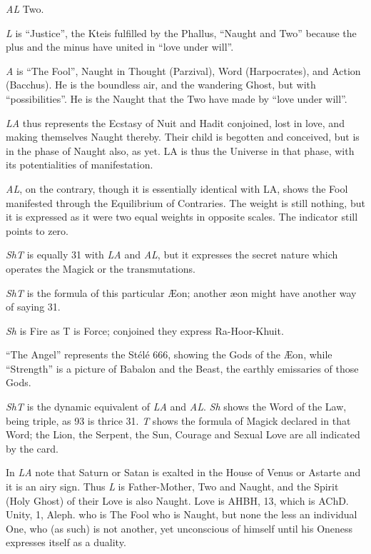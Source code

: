 \textit{AL} \textemdash{} Two.

\textit{L} is \enquote{Justice}, the Kteis fulfilled by the Phallus, \enquote{Naught and Two} because the plus and the minus have united in \enquote{love under will}.

\textit{A} is \enquote{The Fool}, Naught in Thought (Parzival), Word (Harpocrates), and Action (Bacchus). He is the boundless air, and the wandering Ghost, but with \enquote{possibilities}. He is the Naught that the Two have made by \enquote{love under will}.

\textit{LA} thus represents the Ecstasy of Nuit and Hadit conjoined, lost in love, and making themselves Naught thereby. Their child is begotten and conceived, but is in the phase of Naught also, as yet. LA is thus the Universe in that phase, with its potentialities of manifestation.

\textit{AL}, on the contrary, though it is essentially identical with LA, shows the Fool manifested through the Equilibrium of Contraries. The weight is still nothing, but it is expressed as it were two equal weights in opposite scales. The indicator still points to zero.

\textit{ShT} is equally 31 with \textit{LA} and \textit{AL}, but it expresses the secret nature which operates the Magick or the transmutations.

\textit{ShT} is the formula of this particular \AE{}on; another \ae{}on might have another way of saying 31.

\textit{Sh} is Fire as T is Force; conjoined they express Ra-Hoor-Khuit.

\enquote{The Angel} represents the St\'{e}l\'{e} 666, showing the Gods of the \AE{}on, while \enquote{Strength} is a picture of Babalon and the Beast, the earthly emissaries of those Gods.

\textit{ShT} is the dynamic equivalent of \textit{LA} and \textit{AL}. \textit{Sh} shows the Word of the Law, being triple, as 93 is thrice 31. \textit{T} shows the formula of Magick declared in that Word; the Lion, the Serpent, the Sun, Courage and Sexual Love are all indicated by the card.

In \textit{LA} note that Saturn or Satan is exalted in the House of Venus or Astarte and it is an airy sign. Thus \textit{L} is Father-Mother, Two and Naught, and the Spirit (Holy Ghost) of their Love is also Naught. Love is AHBH, 13, which is AChD. Unity, 1, Aleph. who is The Fool who is Naught, but none the less an individual One, who (as such) is not another, yet unconscious of himself until his Oneness expresses itself as a duality.


